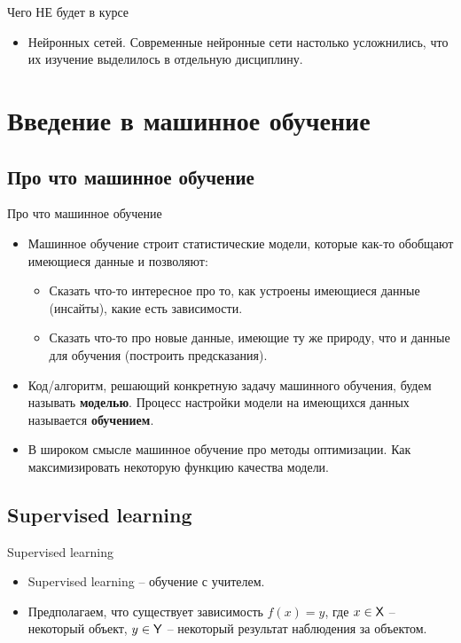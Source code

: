 \documentclass[9pt]{beamer}
\begin{document}
\begin{frame}{Чего НЕ будет в курсе}
\begin{itemize}
    \item Нейронных сетей. Современные нейронные сети настолько усложнились, что их изучение выделилось в отдельную дисциплину.
\end{itemize}
\end{frame}

\section{Введение в машинное обучение}

\subsection{Про что машинное обучение}


\begin{frame}{Про что машинное обучение}
\begin{itemize}
    \item Машинное обучение строит статистические модели, которые как-то обобщают имеющиеся данные и позволяют:
    \begin{itemize}
        \item Сказать что-то интересное про то, как устроены имеющиеся данные (инсайты), какие есть зависимости.
        \item Сказать что-то про новые данные, имеющие ту же природу, что и данные для обучения (построить предсказания).
    \end{itemize}
    \item Код/алгоритм, решающий конкретную задачу машинного обучения, будем называть \textbf{моделью}. Процесс настройки модели на имеющихся данных называется \textbf{обучением}.
    \item В широком смысле машинное обучение про методы оптимизации. Как максимизировать некоторую функцию качества модели.
\end{itemize}
\end{frame}

\subsection{Supervised learning}
\begin{frame}{Supervised learning}
\begin{itemize}
    \item Supervised learning -- обучение с учителем.
    \item Предполагаем, что существует зависимость $f(x) = y$, где $x\in \sf{X}$ – некоторый объект, $y\in \sf{Y}$ – некоторый результат наблюдения за объектом.
\end{itemize}
\end{frame}
\end{document}
